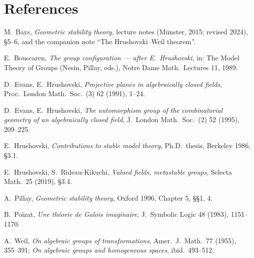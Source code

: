 \documentclass[11pt,oneside]{article}
\theoremstyle{definition}
\theoremstyle{remark}
\begin{document}
\section*{References}
\begin{enumerate}[label={[\arabic*]},leftmargin=8mm]
\item M.~Bays, \emph{Geometric stability theory}, lecture notes (M\"unster, 2015; revised 2024), \S5--6, and the companion note ``The Hrushovski--Weil theorem''.
\item E.~Bouscaren, \emph{The group configuration --- after E.~Hrushovski}, in: The Model Theory of Groups (Nesin, Pillay, eds.), Notre Dame Math.\ Lectures 11, 1989.
\item D.~Evans, E.~Hrushovski, \emph{Projective planes in algebraically closed fields}, Proc.\ London Math.\ Soc.\ (3) 62 (1991), 1--24.
\item D.~Evans, E.~Hrushovski, \emph{The automorphism group of the combinatorial geometry of an algebraically closed field}, J.\ London Math.\ Soc.\ (2) 52 (1995), 209--225.
\item E.~Hrushovski, \emph{Contributions to stable model theory}, Ph.D.\ thesis, Berkeley 1986, \S3.1.
\item E.~Hrushovski, S.~Rideau-Kikuchi, \emph{Valued fields, metastable groups}, Selecta Math.\ 25 (2019), \S3.4.
\item A.~Pillay, \emph{Geometric stability theory}, Oxford 1996, Chapter 5, \S\S1, 4.
\item B.~Poizat, \emph{Une th\'eorie de Galois imaginaire}, J.\ Symbolic Logic 48 (1983), 1151--1170.
\item A.~Weil, \emph{On algebraic groups of transformations}, Amer.\ J.\ Math.\ 77 (1955), 355--391; \emph{On algebraic groups and homogeneous spaces}, ibid.\ 493--512.
\end{enumerate}
\end{document}
